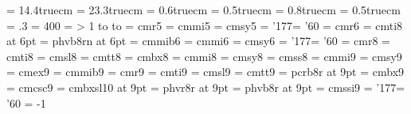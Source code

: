 
\magnification\magstephalf
\hsize = 14.4truecm \vsize = 23.3truecm
\hoffset = 0.6truecm \voffset = 0.5truecm
\topskip = 0.8truecm
\parindent = 0.5truecm \parskip = .3\baselineskip
\tolerance = 400
\headline = {%
    \ifnum\pageno > 1
    \hbox to %
    \else\hbox to \hsize{\hfill}\fi}
%
\newfam\scfam                                                     %
\newfam\bsfam                                              %
\newfam\tbfam                                               %
\newfam\sffam                                                    %
\newfam\sfbfam                                              %
\newfam\sfifam                                            %
\newskip\ttglue
%
\font\fiverm = cmr5
\font\fivei  = cmmi5
\font\fivesy = cmsy5
\skewchar\fivei = '177\skewchar\fivesy = '60
%
\font\sixrm = cmr6
\font\sixit = cmti8 at 6pt
\font\sixbf = phvb8rn at 6pt  %
\font\sixbi = cmmib6
\font\sixi  = cmmi6
\font\sixsy = cmsy6
\skewchar\sixi = '177\skewchar\sixsy = '60
%
\font\eightrm = cmr8
\font\eightit = cmti8
\font\eightsl = cmsl8
\font\eighttt = cmtt8
\font\eightbf = cmbx8
\font\eighti  = cmmi8
\font\eightsy = cmsy8
\font\eightss = cmss8
%
\font\ninei  = cmmi9
\font\ninesy = cmsy9
\font\nineex = cmex9
\font\ninebi = cmmib9
\font\ninerm = cmr9
\font\nineit = cmti9
\font\ninesl = cmsl9
\font\ninett = cmtt9 %
\font\ninetb = pcrb8r at 9pt
\font\ninebf = cmbx9
\font\ninesc = cmcsc9
\font\ninebs = cmbxsl10 at 9pt
\font\niness = phvr8r at 9pt  %
\font\ninesb = phvb8r at 9pt  %
\font\ninesi = cmssi9
\skewchar\ninei = '177\skewchar\ninesy = '60
\hyphenchar\ninett = -1

\ifx\eightpoint\undefined
   \def\eightpoint{%
      \def\rm{\fam0\eightrm}%
      \textfont0 = \eightrm\scriptfont0 = \sixrm  \scriptscriptfont0 = \fiverm%
      \textfont1 = \eighti \scriptfont1 = \sixi   \scriptscriptfont1 = \fivei%
      \textfont2 = \eightsy\scriptfont2 = \sixsy  \scriptscriptfont2 = \fivesy%
      \textfont3 = \tenex  \scriptfont3 = \tenex  \scriptscriptfont3 = \tenex%
      \def\it{\fam\itfam\eightit}\textfont\itfam = \eightit%
      \def\sl{\fam\slfam\eightsl}\textfont\slfam = \eightsl%
      \def\tt{\fam\ttfam\eighttt}\textfont\ttfam = \eighttt%
      \textfont\bffam = \eightbf \scriptfont\bffam = \sixbf%
      \scriptscriptfont\bffam = \fivebf%
      \def\bf{\fam\bffam\eightbf}%
      \def\sf{\fam\sffam\eightss}\textfont\sffam = \eightss%
      \normalbaselineskip = 10pt%
      \setbox\strutbox = \hbox{\vrule height7.5pt depth2.5pt width0pt}%
      \normalbaselines\rm}
\fi

